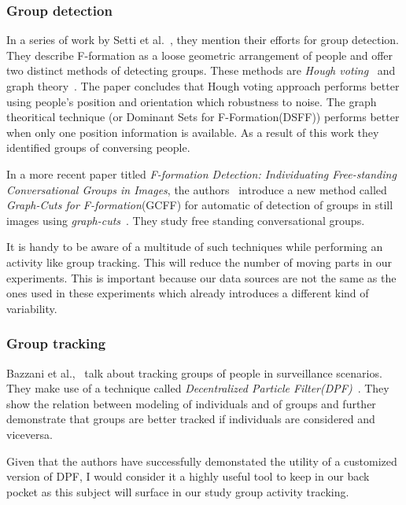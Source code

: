 \subsubsection{Group detection}
In a series of work by Setti et al.~\cite{6616147,6738732}, they
mention their efforts for group detection. They describe F-formation
as a loose geometric arrangement of people and offer two distinct
methods of detecting groups. These methods are \emph{Hough
  voting}~\cite{Duda:1972:UHT:361237.361242} and graph
theory~\cite{Hung:2011:DFD:2070481.2070525}. The paper concludes that
Hough voting approach performs better using people's position and
orientation which robustness to noise. The graph theoritical technique
(or Dominant Sets for F-Formation(DSFF)) performs better when only one
position information is available. As a result of this work they
identified groups of conversing people.

In a more recent paper titled \emph{F-formation Detection:
  Individuating Free-standing Conversational Groups in Images}, the
authors~\cite{DBLP:journals/corr/SettiRBC14} introduce a new method
called \emph{Graph-Cuts for F-formation}(GCFF) for automatic of
detection of groups in still images using
\emph{graph-cuts}~\cite{greig1989exact}. They study free standing
conversational groups.

It is handy to be aware of a multitude of such techniques while
performing an activity like group tracking. This will reduce the
number of moving parts in our experiments. This is important because
our data sources are not the same as the ones used in these
experiments which already introduces a different kind of variability.


\subsubsection{Group tracking}
Bazzani et al.,~\cite{6247888} talk about tracking groups of people in
surveillance scenarios. They make use of a technique called
\emph{Decentralized Particle Filter(DPF)}~\cite{5629376}. They show the
relation between modeling of individuals and of groups and further
demonstrate that groups are better tracked if individuals are
considered and viceversa.

Given that the authors have successfully demonstated the utility of a
customized version of DPF, I would consider it a highly useful tool to
keep in our back pocket as this subject will surface in our study
group activity tracking.


